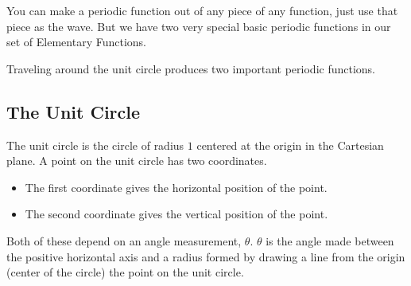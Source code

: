 \documentclass{ximera}
\begin{document}
You can make a periodic function out of any piece of any function, just use that piece as the wave. But we have two very special basic periodic functions in our set of Elementary Functions.



Traveling around the unit circle produces two important periodic functions.














\subsection*{The Unit Circle}
\hfill\break


The unit circle is the circle of radius $1$ centered at the origin in the Cartesian plane. A point on the unit circle has two coordinates.  

\begin{itemize}
\item The first coordinate gives the horizontal position of the point. 
\item The second coordinate gives the vertical position of the point.  
\end{itemize}

Both of these depend on an angle measurement, $\theta$. $\theta$ is the angle made between the positive horizontal axis and a radius formed by drawing a line from the origin (center of the circle) the point on the unit circle.
\end{document}
